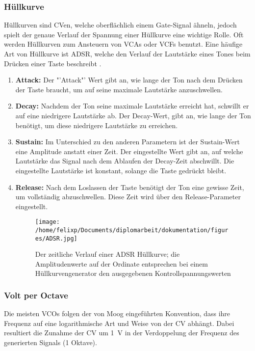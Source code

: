 \subsubsection{Hüllkurve}
\label{sec:org805c13a}
Hüllkurven sind \acl{CV}en, welche oberflächlich einem Gate-Signal ähneln, jedoch spielt der genaue Verlauf der Spannung einer Hüllkurve eine wichtige Rolle. Oft werden Hüllkurven zum Ansteuern von \acp{VCA} oder \acp{VCF} benutzt. Eine häufige Art von Hüllkurve ist \ac{ADSR}, welche den Verlauf der Lautstärke eines Tones beim Drücken einer Taste beschreibt \cite{envelopes}.

\begin{enumerate}
\item \textbf{Attack:}
\label{sec:orga23f085}
Der "'Attack"' Wert gibt an, wie lange der Ton nach dem Drücken der Taste braucht, um auf seine maximale Lautstärke anzuschwellen.

\item \textbf{Decay:}
\label{sec:org1ae7906}
Nachdem der Ton seine maximale Lautstärke erreicht hat, schwillt er auf eine niedrigere Lautstärke ab. Der Decay-Wert, gibt an, wie lange der Ton benötigt, um diese niedrigere Lautstärke zu erreichen.

\item \textbf{Sustain:}
\label{sec:org3fff746}
Im Unterschied zu den anderen Parametern ist der Sustain-Wert eine Amplitude anstatt einer Zeit. Der eingestellte Wert gibt an, auf welche Lautstärke das Signal nach dem Ablaufen der Decay-Zeit abschwillt. Die eingestellte Lautstärke ist konstant, solange die Taste gedrückt bleibt.

\item \textbf{Release:}
\label{sec:org4788b70}
Nach dem Loslassen der Taste benötigt der Ton eine gewisse Zeit, um vollständig abzuschwellen.  Diese Zeit wird über den Release-Parameter eingestellt.

\begin{figure}[htbp]
\centering
\texttt{[image: /home/felixp/Documents/diplomarbeit/dokumentation/figures/ADSR.jpg]}
\caption{Der zeitliche Verlauf einer ADSR Hüllkurve; die Amplitudenwerte auf der Ordinate entsprechen bei einem Hüllkurvengenerator den ausgegebenen Kontrollspannungswerten  \cite{envelopes}}
\end{figure}
\end{enumerate}

\subsubsection{Volt per Octave}
\label{sec:org050e610}
Die meisten \acsp{VCO} folgen der von Moog eingeführten Konvention, dass ihre Frequenz auf eine logarithmische Art und Weise von der \acl{CV} abhängt. Dabei resultiert die Zunahme der \acl{CV} um \SI{1}{\volt} in der Verdoppelung der Frequenz des generierten Signals (1 Oktave).

